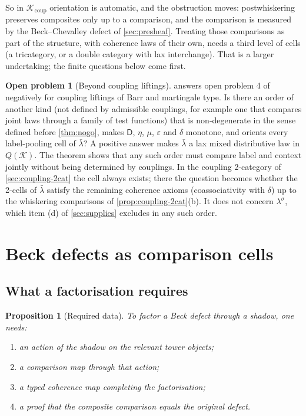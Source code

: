 \documentclass[11pt]{article}
\newtheorem{proposition}[theorem]{Proposition}
\theoremstyle{definition}
\newtheorem{problem}[theorem]{Open problem}
\newcommand{\D}{\mathsf D}
\newcommand{\ls}{\lambda^{\sigma}}
\newcommand{\lb}{\bar\lambda}
\begin{document}
So in $\mathcal K_{\mathrm{coup}}$ orientation is automatic, and the obstruction moves: postwhiskering preserves composites only up
to a comparison, and the comparison is measured by the Beck--Chevalley defect of \cref{sec:presheaf}. Treating those comparisons as part
of the structure, with coherence laws of their own, needs a third level of cells (a tricategory, or a double category with lax
interchange). That is a larger undertaking; the finite questions below come first.

\begin{problem}[Beyond coupling liftings]\label{op:twocat}
 answers open problem 4 of \cite{Tower} negatively for coupling liftings of Barr and martingale type. Is there an order
of another kind (not defined by admissible couplings, for example one that compares joint laws through a family of test functions) that
is non-degenerate in the sense defined before \cref{thm:nogo}, makes $\D$, $\eta$, $\mu$, $\varepsilon$ and $\delta$ monotone, and orients every label-pooling cell of $\lb$? A
positive answer makes $\lb$ a lax mixed distributive law in $Q(\mathcal K)$. The theorem shows that any such order must compare label and
context jointly without being determined by couplings. In the coupling 2-category of \cref{sec:coupling-2cat} the cell always exists;
there the question becomes whether the 2-cells of $\lb$ satisfy the remaining coherence axioms (coassociativity with $\delta$) up to the
whiskering comparisons of \cref{prop:coupling-2cat}(b). It does not concern $\ls$, which item (d) of \cref{sec:supplies} excludes in any such order.
\end{problem}

\section{Beck defects as comparison cells}\label{sec:defects}

\subsection{What a factorisation requires}
\begin{proposition}[Required data]\label{prop:required}
To factor a Beck defect through a shadow, one needs:
\begin{enumerate}[label=(\roman*)]
\item an action of the shadow on the relevant tower objects;
\item a comparison map through that action;
\item a typed coherence map completing the factorisation;
\item a proof that the composite comparison equals the original defect.
\end{enumerate}
\end{proposition}
\end{document}
